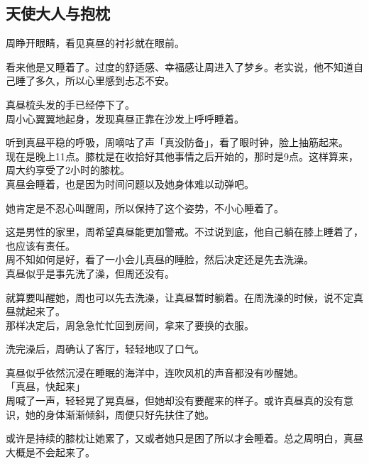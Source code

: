 \subsection{天使大人与抱枕}

周睁开眼睛，看见真昼的衬衫就在眼前。

看来他是又睡着了。过度的舒适感、幸福感让周进入了梦乡。老实说，他不知道自己睡了多久，所以心里感到忐忑不安。

真昼梳头发的手已经停下了。\\

周小心翼翼地起身，发现真昼正靠在沙发上呼呼睡着。

听到真昼平稳的呼吸，周嘀咕了声「真没防备」，看了眼时钟，脸上抽筋起来。\\

现在是晚上11点。膝枕是在收拾好其他事情之后开始的，那时是9点。这样算来，周大约享受了2小时的膝枕。\\

真昼会睡着，也是因为时间问题以及她身体难以动弹吧。

她肯定是不忍心叫醒周，所以保持了这个姿势，不小心睡着了。

这是男性的家里，周希望真昼能更加警戒。不过说到底，他自己躺在膝上睡着了，也应该有责任。\\

周不知如何是好，看了一小会儿真昼的睡脸，然后决定还是先去洗澡。\\

真昼似乎是事先洗了澡，但周还没有。

就算要叫醒她，周也可以先去洗澡，让真昼暂时躺着。在周洗澡的时候，说不定真昼就起来了。\\

那样决定后，周急急忙忙回到房间，拿来了要换的衣服。\\

\vspace{2\baselineskip}

洗完澡后，周确认了客厅，轻轻地叹了口气。

真昼似乎依然沉浸在睡眠的海洋中，连吹风机的声音都没有吵醒她。\\

「真昼，快起来」\\

周喊了一声，轻轻晃了晃真昼，但她却没有要醒来的样子。或许真昼真的没有意识，她的身体渐渐倾斜，周便只好先扶住了她。

或许是持续的膝枕让她累了，又或者她只是困了所以才会睡着。总之周明白，真昼大概是不会起来了。\\

